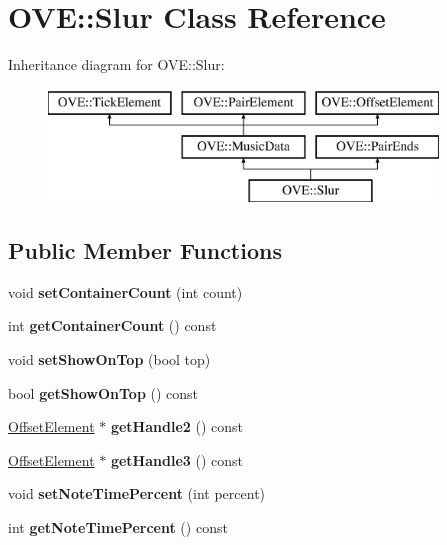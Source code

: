 \hypertarget{class_o_v_e_1_1_slur}{}\section{O\+VE\+:\+:Slur Class Reference}
\label{class_o_v_e_1_1_slur}
Inheritance diagram for O\+VE\+:\+:Slur\+:\begin{figure}[H]
\begin{center}
\leavevmode
\includegraphics[height=3.000000cm]{class_o_v_e_1_1_slur}
\end{center}
\end{figure}
\subsection*{Public Member Functions}
\begin{DoxyCompactItemize}
\item 
\mbox{\label{class_o_v_e_1_1_slur_a1b90e36c2b38d645fab05f4a2a9c635b}} 
void {\bfseries set\+Container\+Count} (int count)
\item 
\mbox{\label{class_o_v_e_1_1_slur_a4af8be56be2b540f4eb838da5469285c}} 
int {\bfseries get\+Container\+Count} () const
\item 
\mbox{\label{class_o_v_e_1_1_slur_a2208450e9c05984409709072a69911a7}} 
void {\bfseries set\+Show\+On\+Top} (bool top)
\item 
\mbox{\label{class_o_v_e_1_1_slur_aa9857455e4ec62471679ef7bce3bd394}} 
bool {\bfseries get\+Show\+On\+Top} () const
\item 
\mbox{\label{class_o_v_e_1_1_slur_a943241acb7768d3e622120a3836b5a46}} 
\hyperlink{class_o_v_e_1_1_offset_element}{Offset\+Element} $\ast$ {\bfseries get\+Handle2} () const
\item 
\mbox{\label{class_o_v_e_1_1_slur_a5ed18c7497f4f14693ecfe000c6c165d}} 
\hyperlink{class_o_v_e_1_1_offset_element}{Offset\+Element} $\ast$ {\bfseries get\+Handle3} () const
\item 
\mbox{\label{class_o_v_e_1_1_slur_a6fccd3c35165ed092d43bceec66d07e9}} 
void {\bfseries set\+Note\+Time\+Percent} (int percent)
\item 
\mbox{\label{class_o_v_e_1_1_slur_a382f340d068a9dd31ff8fae4d813071d}} 
int {\bfseries get\+Note\+Time\+Percent} () const
\end{DoxyCompactItemize}
